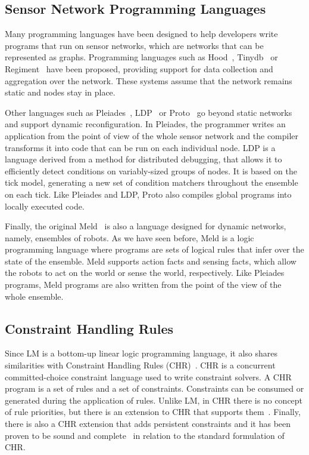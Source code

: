 \subsection{Sensor Network Programming Languages}

Many programming languages have been designed to help developers write programs
that run on sensor networks, which are networks that can be represented as
graphs.  Programming languages such as
Hood~\cite{Whitehouse:2004:HNA:990064.990079},
Tinydb~\cite{Madden:2005:TAQ:1061318.1061322} or
Regiment~\cite{Newton:2007:RMS:1236360.1236422} have been proposed, providing
support for data collection and aggregation over the network. These systems
assume that the network remains static and nodes stay in place.

Other languages such as Pleiades~\cite{Kothari:2007:REP:1250734.1250757},
LDP~\cite{4543691} or Proto~\cite{Beal:2006:IEE:1137236.1137354} go beyond
static networks and support dynamic reconfiguration. In Pleiades, the
programmer writes an application from the point of view of the whole
sensor network and the compiler transforms it into code that can be run on
each individual node.  LDP is a language derived from a method for
distributed debugging, that allows it to efficiently detect conditions on
variably-sized groups of nodes. It is based on the tick model, generating
a new set of condition matchers throughout the ensemble on each tick.
Like Pleiades and LDP, Proto also compiles global programs into locally
executed code.

Finally, the original Meld~\cite{ashley-rollman-iclp09} is also a language
designed for dynamic networks, namely, ensembles of robots. As we have seen
before, Meld is a logic programming language where programs are sets of logical
rules that infer over the state of the ensemble. Meld supports action facts and
sensing facts, which allow the robots to act on the world or sense the world,
respectively. Like Pleiades programs, Meld programs are also written from the
point of the view of the whole ensemble.

\subsection{Constraint Handling Rules}

Since LM is a bottom-up linear logic programming language, it also shares
similarities with Constraint Handling Rules
(CHR)~\cite{Betz:2005kx,Betz:2013:LBA:2422085.2422086}.  CHR is a concurrent
committed-choice constraint language used to write constraint solvers. A CHR
program is a set of rules and a set of constraints. Constraints can be consumed
or generated during the application of rules. Unlike LM, in CHR there is no
concept of rule priorities, but there is an extension to CHR that supports
them~\cite{DeKoninck:2007:URP:1273920.1273924}. Finally, there is also a CHR
extension that adds persistent constraints and it has been proven to be sound
and complete~\cite{DBLP:journals/corr/abs-1007-3829} in relation to the standard
formulation of CHR.

